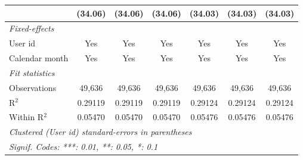 \begin{table}[htbp]
\begin{footnotesize}
\begin{tabular}{lcccccc}
                                     & (34.06)        & (34.06)        & (34.06)        & (34.03)        & (34.03)        & (34.03)\\
         \midrule \emph{Fixed-effects} &   &   &   &   &   &  \\
         User id                     & Yes            & Yes            & Yes            & Yes            & Yes            & Yes\\
         Calendar month              & Yes            & Yes            & Yes            & Yes            & Yes            & Yes\\
         \midrule \emph{Fit statistics} &   &   &   &   &   &  \\
         Observations                & 49,636         & 49,636         & 49,636         & 49,636         & 49,636         & 49,636\\
         R$^2$                       & 0.29119        & 0.29119        & 0.29119        & 0.29124        & 0.29124        & 0.29124\\
         Within R$^2$                & 0.05470        & 0.05470        & 0.05470        & 0.05476        & 0.05476        & 0.05476\\
         \midrule\midrule\multicolumn{7}{l}{\emph{Clustered (User id) standard-errors in parentheses}}\\
         \multicolumn{7}{l}{\emph{Signif. Codes: ***: 0.01, **: 0.05, *: 0.1}}\\
      \end{tabular}
   \end{footnotesize}
\end{table}



